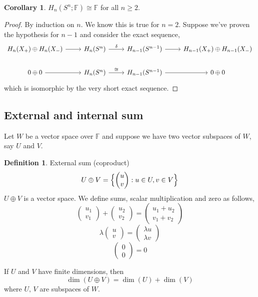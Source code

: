 \documentclass[a4paper,14pt]{extarticle}
\theoremstyle{definition}
\newtheorem*{definition}{Definition}
\newtheorem*{corollary}{Corollary}
\begin{document}
\begin{corollary}
	$H_n(S^n;\mathbb{F})\cong\mathbb{F}$ for all $n\geq 2$.
\end{corollary}

\begin{proof}
	By induction on $n$. We know this is true for $n=2$. Suppose we've
	proven the hypothesis for $n-1$ and consider the exact sequence,
	\[
	\begin{tikzcd}
		H_n(X_+)\oplus H_n(X_-)\arrow{r} & H_n(S^n)\arrow{r}
		{\delta} & H_{n-1}(S^{n-1})
		\arrow{r} & H_{n-1}(X_+)\oplus H_{n-1}(X_-) \\
		0\oplus 0\arrow{r} & H_n(S^n)\arrow{r}{\cong} & H_{n-1}(S^{n-1})
		\arrow{r} & 0\oplus 0
	\end{tikzcd}
	\]
	which is isomorphic by the very short exact sequence.
\end{proof}

\subsection{External and internal sum}
Let $W$ be a vector space over $\mathbb{F}$ and suppose we have two
vector subspaces of $W$, say $U$ and $V$.
\begin{definition}{External sum (coproduct)}
	\[U\oplus V=\Bigl\{\begin{pmatrix}u \\ v\end{pmatrix}: u\in U, v\in V
		\Bigr\}\]
	$U\oplus V$ is a vector space. We define sums, scalar multiplication
	and zero as follows,
	\[\begin{pmatrix}
		u_1\\v_1
	\end{pmatrix}+\begin{pmatrix}
		u_2\\v_2
	\end{pmatrix}=
	\begin{pmatrix}
		u_1+u_2\\v_1+v_2
	\end{pmatrix}\]
	\[\lambda\begin{pmatrix}
		u\\v
	\end{pmatrix}=\begin{pmatrix}
		\lambda u\\ \lambda v
	\end{pmatrix}\]
	\[\begin{pmatrix}
		0\\0
	\end{pmatrix} = 0
	\]
\end{definition}
If $U$ and $V$ have finite dimensions, then 
\[\dim(U\oplus V)=\dim(U)+\dim(V)\] where $U, \,V$ are subspaces of $W$.
\end{document}
